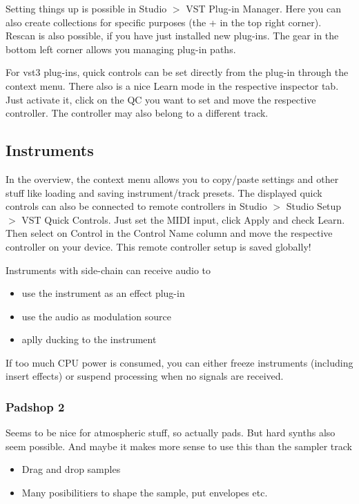 \documentclass[10pt]{article}
\begin{document}
Setting things up is possible in Studio $>$ VST Plug-in Manager. Here you can also create collections for specific purposes (the + in the top right corner). Rescan is also possible, if you have just installed new plug-ins. The gear in the bottom left corner allows you managing plug-in paths.

For vst3 plug-ins, quick controls can be set directly from the plug-in through the context menu. There also is a nice Learn mode in the respective inspector tab. Just activate it, click on the QC you want to set and move the respective controller. The controller may also belong to a different track.

\subsection{Instruments}

In the overview, the context menu allows you to copy/paste settings and other stuff like loading and saving instrument/track presets. The displayed quick controls can also be connected to remote controllers in Studio $>$ Studio Setup $>$ VST Quick Controls. Just set the MIDI input, click Apply and check Learn. Then select on Control in the Control Name column and move the respective controller on your device. This remote controller setup is saved globally!

Instruments with side-chain can receive audio to
\begin{itemize}
	\item use the instrument as an effect plug-in
	\item use the audio as modulation source
	\item aplly ducking to the instrument
\end{itemize}

If too much CPU power is consumed, you can either freeze instruments (including insert effects) or suspend processing when no signals are received.

\subsubsection{Padshop 2}

Seems to be nice for atmospheric stuff, so actually pads. But hard synths also seem possible. And maybe it makes more sense to use this than the sampler track

\begin{itemize}
	\item Drag and drop samples
	\item Many posibilitiers to shape the sample, put envelopes etc.
\end{itemize}
\end{document}
